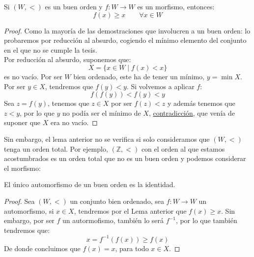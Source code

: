 \begin{lema}
    Si $(W,<)$ es un buen orden y $f:W\to W$ es un morfismo, entonces:
    \begin{equation*}
        f(x) \geq x \qquad \forall x\in W
    \end{equation*}
    \begin{proof}
        Como la mayoría de las demostraciones que involucren a un buen orden: lo probaremos por reducción al absurdo, cogiendo el mínimo elemento del conjunto en el que no se cumple la tesis.\\

        \noindent
        Por reducción al absurdo, suponemos que:
        \begin{equation*}
            X = \{x\in W \mid f(x) < x\}
        \end{equation*}
        es no vacío. Por ser $W$ bien ordenado, este ha de tener un mínimo, $y=\min X$. Por ser $y\in X$, tendremos que $f(y) < y$. Si volvemos a aplicar $f$:
        \begin{equation*}
            f(f(y)) < f(y) < y
        \end{equation*}
        Sea $z = f(y)$, tenemos que $z\in X$ por ser $f(z) < z$ y además tenemos que $z < y$, por lo que $y$ no podía ser el mínimo de $X$, \underline{contradicción}, que venía de suponer que $X$ era no vacío.
    \end{proof}
\end{lema}

\begin{ejemplo}
    Sin embargo, el lema anterior no se verifica si solo consideramos que $(W,<)$ tenga un orden total. Por ejemplo, $(\mathbb{Z},<)$ con el orden al que estamos acostumbrados es un orden total que no es un buen orden y podemos considerar el morfismo:
\end{ejemplo}

\begin{coro}
    El único automorfismo de un buen orden es la identidad.
    \begin{proof}
        Sea $(W,<)$ un conjunto bien ordenado, sea $f:W\to W$ un automorfismo, si $x\in X$, tendremos por el Lema anterior que $f(x) \geq x$. Sin embargo, por ser $f$ un autormofismo, también lo será $f^{-1}$, por lo que también tendremos que:
        \begin{equation*}
            x = f^{-1}(f(x)) \geq f(x)
        \end{equation*}
        De donde concluimos que $f(x) = x$, para todo $x\in X$.
    \end{proof}
\end{coro}

